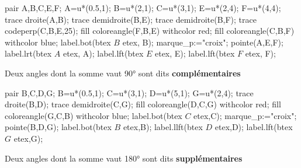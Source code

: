 \begin{changemargin}{0mm}{-25mm}
   \begin{definition}
      \begin{minipage}{0.3\linewidth}
         \begin{center}
            \begin{Geometrie}[CoinHD={(6u,5u)}]
               pair A,B,C,E,F;
               A=u*(0.5,1);
               B=u*(2,1);
               C=u*(3,1);
               E=u*(2,4);
               F=u*(4,4);
               trace droite(A,B);
               trace demidroite(B,E);
               trace demidroite(B,F);
               trace codeperp(C,B,E,25);
               fill coloreangle(F,B,E) withcolor red;
               fill coloreangle(C,B,F) withcolor blue;
               label.bot(btex $B$ etex, B);
               marque_p:="croix";
               pointe(A,E,F);
               label.lrt(btex $A$ etex, A);               
               label.lft(btex $E$ etex, E);
               label.lft(btex $F$ etex, F);
            \end{Geometrie}
         \end{center}
      \end{minipage}
      \hfill
      \begin{minipage}{0.6\linewidth}
         Deux angles dont la somme vaut \ang{90} sont dits \textbf{complémentaires}
      \end{minipage}
   \end{definition}

   \begin{definition}
      \begin{minipage}{0.3\linewidth}
         \begin{center}
            \begin{Geometrie}[CoinHD={(6u,5u)}]
               pair B,C,D,G;
               B=u*(0.5,1);
               C=u*(3,1);
               D=u*(5,1);
               G=u*(2,4);
               trace droite(B,D);
               trace demidroite(C,G);
               fill coloreangle(D,C,G) withcolor red;
               fill coloreangle(G,C,B) withcolor blue;
               label.bot(btex $C$ etex,C);
               marque_p:="croix";
               pointe(B,D,G);
               label.bot(btex $B$ etex,B);               
               label.llft(btex $D$ etex,D);
               label.lft(btex $G$ etex,G);
            \end{Geometrie}
         \end{center}
      \end{minipage}
      \hfill
      \begin{minipage}{0.6\linewidth}
         Deux angles dont la somme vaut \ang{180} sont dits \textbf{supplémentaires}
      \end{minipage}
   \end{definition}
\end{changemargin}